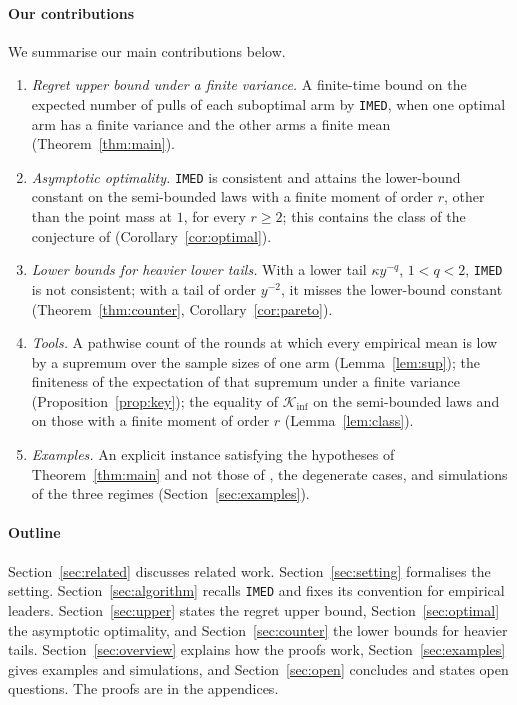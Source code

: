 \documentclass[11pt]{article}
\begin{document}
\paragraph{Our contributions} We summarise our main contributions below.
\begin{enumerate}[label=(\roman*),leftmargin=2.2em]
  \item \emph{Regret upper bound under a finite variance.} A finite-time bound on the expected
    number of pulls of each suboptimal arm by \texttt{IMED}, when one optimal arm has a finite
    variance and the other arms a finite mean (Theorem~\ref{thm:main}).
  \item \emph{Asymptotic optimality.} \texttt{IMED} is consistent and attains the lower-bound
    constant on the semi-bounded laws with a finite moment of order $r$, other than the point mass
    at $1$, for every $r\ge2$; this contains the class of the conjecture of \citet{HT15}
    (Corollary~\ref{cor:optimal}).
  \item \emph{Lower bounds for heavier lower tails.} With a lower tail $\kappa y^{-q}$, $1<q<2$,
    \texttt{IMED} is not consistent; with a tail of order $y^{-2}$, it misses the lower-bound
    constant (Theorem~\ref{thm:counter}, Corollary~\ref{cor:pareto}).
  \item \emph{Tools.} A pathwise count of the rounds at which every empirical mean is low by a
    supremum over the sample sizes of one arm (Lemma~\ref{lem:sup}); the finiteness of the
    expectation of that supremum under a finite variance (Proposition~\ref{prop:key}); the equality
    of $\mathcal K_{\inf}$ on the semi-bounded laws and on those with a finite moment of order $r$
    (Lemma~\ref{lem:class}).
  \item \emph{Examples.} An explicit instance satisfying the hypotheses of Theorem~\ref{thm:main}
    and not those of \citet[Theorem~3]{HT15}, the degenerate cases, and simulations of the three
    regimes (Section~\ref{sec:examples}).
\end{enumerate}

\paragraph{Outline} Section~\ref{sec:related} discusses related work. Section~\ref{sec:setting}
formalises the setting. Section~\ref{sec:algorithm} recalls \texttt{IMED} and fixes its convention
for empirical leaders. Section~\ref{sec:upper} states the regret upper bound,
Section~\ref{sec:optimal} the asymptotic optimality, and Section~\ref{sec:counter} the lower bounds
for heavier tails. Section~\ref{sec:overview} explains how the proofs work,
Section~\ref{sec:examples} gives examples and simulations, and Section~\ref{sec:open} concludes and
states open questions. The proofs are in the appendices.
\end{document}
